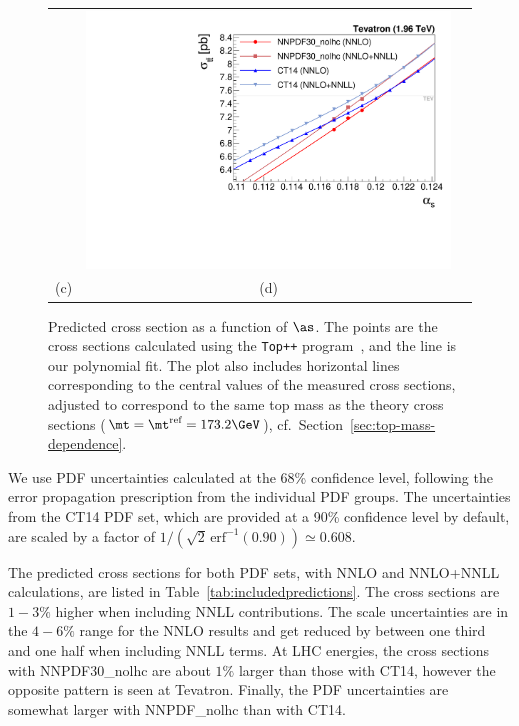 \begin{figure}[t]
\begin{tabular}{ccc}
&
\includegraphics[width=\FitFigureWidth\linewidth]{img/alphas/fits_TEV1960.pdf}
\\[-8pt]
(c) & (d) \\[6pt]
\end{tabular}
\vspace{-0.3cm}
\caption{
  Predicted cross section as a function of $\as$. The points are the cross
  sections calculated using the \texttt{Top++} program~\cite{Czakon:2011xx}, and
  the line is our polynomial fit.
  The plot also includes horizontal lines corresponding to the central
  values of the measured cross sections, adjusted to correspond to the
  same top mass as the theory cross sections ($\mt = \mt^\text{ref} =
  173.2\GeV$), cf.~Section~\ref{sec:top-mass-dependence}.
}
\label{fig:FitsToPrediction}
\end{figure}
% 

We use PDF uncertainties calculated at the 68\% confidence level,
following the error propagation prescription from the individual PDF
groups.
%
The uncertainties from the CT14 PDF set, which are provided at a 90\%
confidence level by default, are scaled by a factor of
$1/(\sqrt2 \, \text{erf}^{-1}( 0.90) )\simeq 0.608 $.

The predicted cross sections for both PDF sets, with NNLO and
NNLO+NNLL calculations, are listed in
Table~\ref{tab:includedpredictions}.
%
The cross sections are $1{-}3\%$ higher when including NNLL
contributions.
%
The scale uncertainties are in the $4{-}6\%$ range for the NNLO
results and get reduced by between one third and one half when
including NNLL terms.
%
At LHC energies, the cross sections with NNPDF30\_nolhc are about $1\%$ larger
than those with CT14, however the opposite pattern is seen at
Tevatron. 
%
Finally, the PDF uncertainties are somewhat larger with NNPDF\_nolhc than
with CT14.

